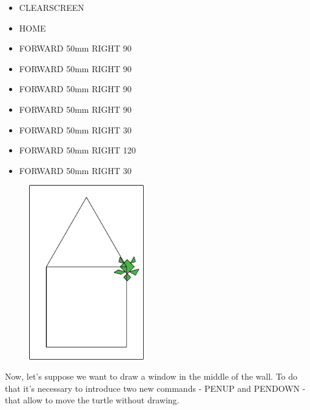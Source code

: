 \begin{scriptsize}
\begin{minipage}{0.40\textwidth}
\begin{itemize}[itemsep=-3pt,parsep=2pt]
\item[] CLEARSCREEN             
\item[] HOME
\item[] FORWARD 50mm RIGHT 90
\item[] FORWARD 50mm RIGHT 90
\item[] FORWARD 50mm RIGHT 90
\item[] FORWARD 50mm RIGHT 90
\item[] FORWARD 50mm RIGHT 30
\item[] FORWARD 50mm RIGHT 120
\item[] FORWARD 50mm RIGHT 30
\end{itemize}
\end{minipage}
\end{scriptsize}
\begin{minipage}{0.4\textwidth}
\begin{figure}[H]
   \includegraphics[width=5.0cm,trim=4 4 8 4,clip]{./images/disegnare/disegnare-7.png}
   \label{dis-7}
\end{figure}
\end{minipage} \hfill

\vskip 1cm

Now, let's suppose we want to draw a window in the middle of the wall. To do that it's necessary to introduce two new commands - PENUP and PENDOWN - that allow to move the turtle without drawing.


\vskip 1cm

